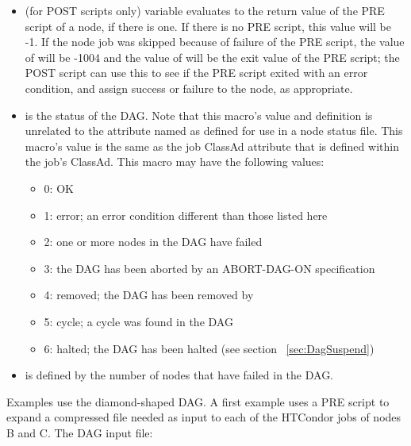 \begin{itemize}
\item {}
 (for POST scripts only)
variable evaluates to the return value of the PRE script of a node, 
if there is one.
If there is no PRE script, this value will be -1.
If the node job was skipped because of failure of the PRE script,
the value of  will be -1004
and the value of  will be the exit value
of the PRE script;
the POST script can use this to see if the PRE script exited
with an error condition, and assign success or failure to the node, as
appropriate.

\item {} is the status of the DAG.
Note that this macro's value and definition is unrelated to the attribute 
named  as defined for use in a node status file.
This macro's value is the same as the job ClassAd attribute 
that is defined within the  job's ClassAd.
This macro may have the following values:
\begin{itemize}
\item 0: OK
\item 1: error; an error condition different than those listed here
\item 2: one or more nodes in the DAG have failed
\item 3: the DAG has been aborted by an ABORT-DAG-ON specification
\item 4: removed; the DAG has been removed by 
\item 5: cycle; a cycle was found in the DAG
\item 6: halted; the DAG has been halted (see section ~\ref{sec:DagSuspend})
\end{itemize}

\item {} is defined by the number of nodes that have failed in the
DAG.

\end{itemize}



Examples use the diamond-shaped DAG.
A first example uses a PRE script to expand a compressed file 
needed as input to each of the HTCondor jobs of nodes B and C.
The DAG input file:

